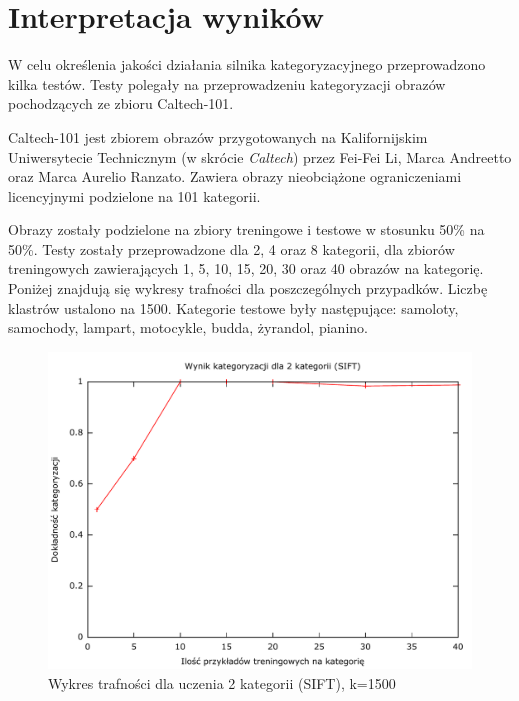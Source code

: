 \chapter{Interpretacja wyników}

W celu określenia jakości działania silnika kategoryzacyjnego przeprowadzono kilka testów. Testy polegały na przeprowadzeniu kategoryzacji obrazów pochodzących ze zbioru Caltech-101.\cite{CALTECH101}

Caltech-101 jest zbiorem obrazów przygotowanych na Kalifornijskim Uniwersytecie Technicznym (w skrócie \emph{Caltech}) przez Fei-Fei Li, Marca Andreetto oraz Marca Aurelio Ranzato. Zawiera obrazy nieobciążone ograniczeniami licencyjnymi podzielone na 101 kategorii.

Obrazy zostały podzielone na zbiory treningowe i testowe w stosunku 50\% na 50\%. Testy zostały przeprowadzone dla 2, 4 oraz 8 kategorii, dla zbiorów treningowych zawierających 1, 5, 10, 15, 20, 30 oraz 40 obrazów na kategorię. Poniżej znajdują się wykresy trafności dla poszczególnych przypadków. Liczbę klastrów ustalono na 1500. Kategorie testowe były następujące: samoloty, samochody, lampart, motocykle, budda, żyrandol, pianino. 

\begin{figure}[h]
	\centering
	\includegraphics[scale=0.8]{graphics/04_interpretacja_wynikow/result-sift-2.pdf}
	\caption{ Wykres trafności dla uczenia 2 kategorii (SIFT), k=1500 }
	\label{fig:result-sift-2}
\end{figure}

